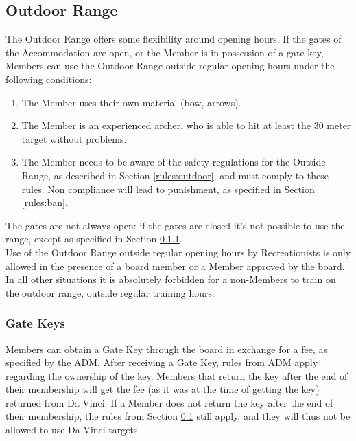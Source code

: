 \documentclass[a4paper]{article}
\begin{document}
\subsection{Outdoor Range}
\label{section:outdoor}
The Outdoor Range offers some flexibility around opening hours. If the gates of the { Accommodation} are open, or the { Member} is in possession of a gate key, { Members} can use the Outdoor Range outside regular opening hours under the following conditions:

\begin{enumerate}
\item The { Member} uses their own material (bow, arrows).
\item The { Member} is an { experienced} { archer}, who is able to hit at least the 30 meter target without problems.
\item The { Member} needs to be aware of the safety regulations for the Outside Range, as described in Section \ref{rules:outdoor}, and must comply to these rules. Non compliance will lead to punishment, as specified in Section \ref{rules:ban}.
\end{enumerate}

The gates are not always open: if the gates are closed it’s not possible to use the range, except as specified in Section \ref{sec:gatekey}. \\

Use of the Outdoor Range outside regular opening hours by { Recreationists} is only allowed in the presence of a board member or a { Member} approved by the board. In all other situations it is absolutely forbidden for a non-{ Members} to train on the outdoor range, outside regular training hours. 

\subsubsection{Gate Keys}
\label{sec:gatekey}
{ Members} can obtain a Gate Key through the board in exchange for a fee, as specified by the { ADM}. After receiving a Gate Key, rules from { ADM} apply regarding the ownership of the key. { Members} that return the key after the end of their membership will get the fee (as it was at the time of getting the key) returned from Da Vinci. If a { Member} does not return the key after the end of their membership, the rules from Section \ref{section:outdoor} still apply, and they will thus not be allowed to use Da Vinci targets.
\end{document}
